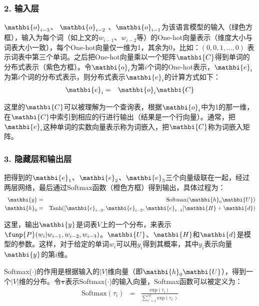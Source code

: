 \subsubsection{2. 输入层}

\parinterval  $ {\mathbi{o}}_{i-3} $、 $ {\mathbi{o}}_{i-2} $ 、$ {\mathbi{o}}_{i-1} $为该语言模型的输入（绿色方框），输入为每个词（如上文的$ w_{i-1}$、$ w_{i-2}$等）的One-hot向量表示（维度大小与词表大小一致），每个One-hot向量仅一维为1，其余为0，比如：$ (0,0,1,\dots,0) $ 表示词表中第三个单词。之后把One-hot向量乘以一个矩阵$ \mathbi{C} $得到单词的分布式表示（紫色方框）。令$ {\mathbi{o}}_i $为第$ i $个词的One-hot表示，$ {\mathbi{e}}_i $为第$ i $个词的分布式表示，则分布式表示$ {\mathbi{e}}_i $的计算方式如下：
\begin{eqnarray}
{\mathbi{e}}_i&=&{\mathbi{o}}_i{\mathbi{C}}
\label{eq:9-60}
\end{eqnarray}

\noindent  这里的$ \mathbi{C} $可以被理解为一个查询表，根据$ {\mathbi{o}}_i $中为1的那一维，在$ \mathbi{C}$中索引到相应的行进行输出（结果是一个行向量）。通常，把${\mathbi{e}}_i$这种单词的实数向量表示称为词嵌入，把$ \mathbi{C} $称为词嵌入矩阵。


\subsubsection{3. 隐藏层和输出层}

\parinterval  把得到的$ {\mathbi{e}}_1 $、$ {\mathbi{e}}_2 $、$ {\mathbi{e}}_3 $三个向量级联在一起，经过两层网络，最后通过Softmax函数（橙色方框）得到输出，具体过程为：
\begin{eqnarray}
{\mathbi{y}}&=&{\textrm{Softmax}}({\mathbi{h}}_0{\mathbi{U}})\label{eq:9-61}\\
{\mathbi{h}}_0&=&{\textrm{Tanh}}([{\mathbi{e}}_{i-3},{\mathbi{e}}_{i-2},{\mathbi{e}}_{i-1}]{\mathbi{H}}+{\mathbi{d}})
\label{eq:9-62}
\end{eqnarray}

\noindent  这里，输出$ {\mathbi{y}}$是词表$V$上的一个分布，来表示$\funp{P}(w_i|w_{i-1},w_{i-2},w_{i-3}) $。$ {\mathbi{U}}$、${\mathbi{H}}$和${\mathbi{d}}$是模型的参数。这样，对于给定的单词$w_i$可以用$y_i$得到其概率，其中$y_i$表示向量${\mathbi{y}}$的第$i$维。

\parinterval Softmax($\cdot$)的作用是根据输入的$|V|$维向量（即${\mathbi{h}}_0{\mathbi{U}}$），得到一个$|V|$维的分布。令${\bm \tau}$表示Softmax($\cdot$)的输入向量，Softmax函数可以被定义为：
\begin{eqnarray}
\textrm{Softmax}(\tau_i)&=&\frac{\textrm{exp}(\tau_i)}  {\sum_{i'=1}^{|V|} \textrm{exp}(\tau_{i'})}
\label{eq:9-120}
\end{eqnarray}

